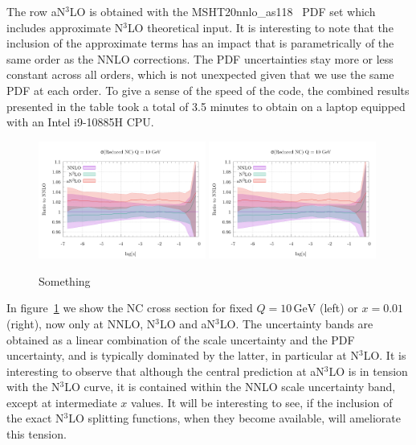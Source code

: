 \documentclass[submission, PhysCodeb]{SciPost}
\newcommand{\GEV}{\,\mathrm{GeV}}
\newcommand{\NNNLO}{N$^3$LO}
\begin{document}
The row a\NNNLO{} is obtained with the
MSHT20nnlo\_as118~\cite{McGowan:2022nag} PDF set which includes
approximate \NNNLO{} theoretical input. It is interesting to note
that the inclusion of the approximate terms has an impact that is
parametrically of the same order as the NNLO corrections. The PDF
uncertainties stay more or less constant across all orders, which is
not unexpected given that we use the same PDF at each order. To give a
sense of the speed of the code, the combined results presented in the
table took a total of 3.5 minutes to obtain on a laptop equipped with an
Intel i9-10885H CPU.
\begin{figure}[tb!]
  \centering\includegraphics[width=0.49\textwidth,page=1]{../paper_runs/inclusive_runs/plot/sigma-ratios.pdf}
  \centering\includegraphics[width=0.49\textwidth,page=3]{../paper_runs/inclusive_runs/plot/sigma-ratios.pdf}
  \caption{Something}
  \label{fig:sigma}
\end{figure}

In figure~\ref{fig:sigma} we show the NC cross section for fixed
$Q=10\GEV$ (left) or $x=0.01$ (right), now only at NNLO, \NNNLO{} and
a\NNNLO{}. The uncertainty bands are obtained as a linear combination
of the scale uncertainty and the PDF uncertainty, and is typically
dominated by the latter, in particular at \NNNLO{}. It is interesting
to observe that although the central prediction at a\NNNLO{} is in
tension with the \NNNLO{} curve, it is contained within the NNLO scale
uncertainty band, except at intermediate $x$ values. It will be
interesting to see, if the inclusion of the exact \NNNLO{} splitting
functions, when they become available, will ameliorate this tension. 
\end{document}
